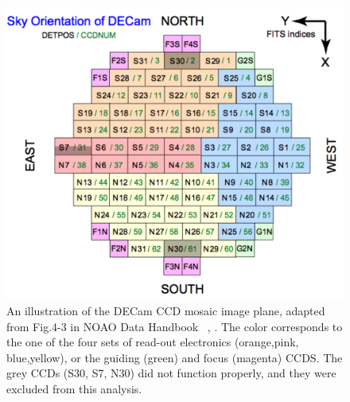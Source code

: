 \documentclass[DM,lsstdraft,toc,usenatbib]{lsstdoc}
\begin{document}
\begin{figure}
\includegraphics[width=1.0\columnwidth]{figs/05_Fig_4_3_NOAO_DECam_ccd_mosaic.png}
\caption{An illustration of the DECam CCD mosaic image plane, adapted from Fig.4-3 in NOAO Data Handbook ~\citep{shaw2015}, . The color corresponds to the one of the four sets of read-out electronics (orange,pink, blue,yellow), or the guiding (green) and focus (magenta) CCDS.  The grey CCDs (S30, S7, N30) did not function properly, and they were excluded from this analysis.}
\label{fig:decam_mosaic_ccd}
\end{figure} 
\end{document}
